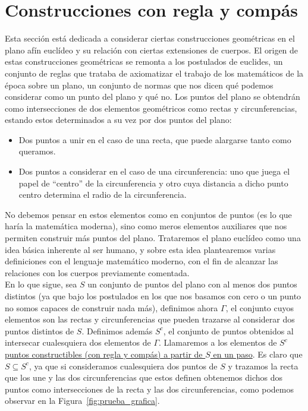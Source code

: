 \section{Construcciones con regla y compás}
Esta sección está dedicada a considerar ciertas construcciones geométricas en el plano afín euclídeo y su relación con ciertas extensiones de cuerpos. El origen de estas construcciones geométricas se remonta a los postulados de euclides, un conjunto de reglas que trataba de axiomatizar el trabajo de los matemáticos de la época sobre un plano, un conjunto de normas que nos dicen qué podemos considerar como un punto del plano y qué no. Los puntos del plano se obtendrán como intersecciones de dos elementos geométricos como rectas y circunferencias, estando estos determinados a su vez por dos puntos del plano:
\begin{itemize}
    \item Dos puntos a unir en el caso de una recta, que puede alargarse tanto como queramos.
    \item Dos puntos a considerar en el caso de una circunferencia: uno que juega el papel de ``centro'' de la circunferencia y otro cuya distancia a dicho punto centro determina el radio de la circunferencia.
\end{itemize}
No debemos pensar en estos elementos como en conjuntos de puntos (es lo que haría la matemática moderna), sino como meros elementos auxiliares que nos permiten construir más puntos del plano. Trataremos el plano euclídeo como una idea básica inherente al ser humano, y sobre esta idea plantearemos varias definiciones con el lenguaje matemático moderno, con el fin de alcanzar las relaciones con los cuerpos previamente comentada.\\

\noindent
En lo que sigue, sea $S$ un conjunto de puntos del plano con al menos dos puntos distintos (ya que bajo los postulados en los que nos basamos con cero o un punto no somos capaces de construir nada más), definimos ahora $\Gamma$, el conjunto cuyos elementos son las rectas y circunferencias que pueden trazarse al considerar dos puntos distintos de $S$. Definimos además $S^c$, el conjunto de puntos obtenidos al intersecar cualesquiera dos elementos de $\Gamma$. Llamaremos a los elementos de $S^c$ \underline{puntos constructibles (con regla y compás) a partir de $S$ en un paso}. Es claro que $S\subseteq S^c$, ya que si consideramos cualesquiera dos puntos de $S$ y trazamos la recta que los une y las dos circunferencias que estos definen obtenemos dichos dos puntos como intersecciones de la recta y las dos circunferencias, como podemos observar en la Figura~\ref{fig:prueba_grafica}.

